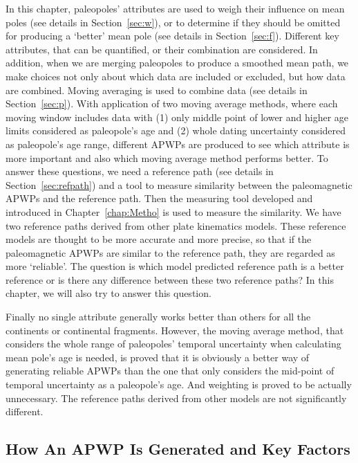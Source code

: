 In this chapter, paleopoles' attributes are used to weigh their influence on
mean poles (see details in Section~\ref{sec:w}), or to determine if they should
be omitted for producing a `better' mean pole (see details in Section~\ref{sec:f}).
Different key attributes, that can be quantified, or their combination are
considered. In addition, when we are merging paleopoles to produce a smoothed
mean path, we make choices not only about which data are included or excluded,
but how data are combined. Moving averaging is used to combine data (see
details in Section~\ref{sec:p}). With application of two moving average methods,
where each moving window includes data with (1) only middle point of lower and
higher age limits considered as paleopole's age and (2) whole dating uncertainty
considered as paleopole's age range, different APWPs are produced to see which
attribute is more important and also which moving average method performs
better. To answer these questions, we need a reference path (see details in
Section~\ref{sec:refpath}) and a tool to measure similarity between the paleomagnetic APWPs
and the reference path. Then the measuring tool developed and introduced in
Chapter~\ref{chap:Metho} is used to measure the similarity. We have two reference paths derived
from other plate kinematics models. These reference models are thought to be
more accurate and more precise, so that if the paleomagnetic APWPs are similar
to the reference path, they are regarded as more `reliable'. The question is
which model predicted reference path is a better reference or is there any
difference between these two reference paths? In this chapter, we will also try
to answer this question.

Finally no single attribute generally works better than others for all the
continents or continental fragments. However, the moving average method, that
considers the whole range of paleopoles' temporal uncertainty when calculating
mean pole's age is needed, is proved that it is obviously a better way of
generating reliable APWPs than the one that only considers the mid-point of
temporal uncertainty as a paleopole's age. And weighting is proved to be
actually unnecessary. The reference paths derived from other models are not
significantly different.

\subsection{How An APWP Is Generated and Key Factors}

